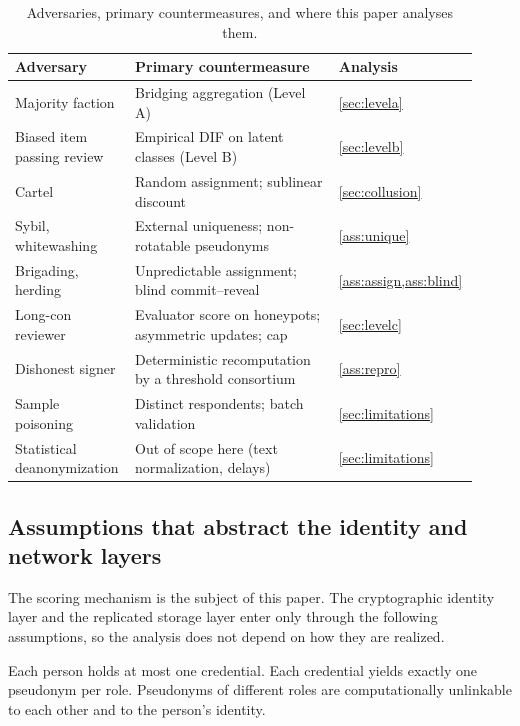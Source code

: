 \begin{table}[t]
\centering\small
\caption{Adversaries, primary countermeasures, and where this paper analyses them.}
\label{tab:threats}
\begin{tabular}{@{}>{\raggedright\arraybackslash}p{0.25\linewidth}>{\raggedright\arraybackslash}p{0.43\linewidth}>{\raggedright\arraybackslash}p{0.24\linewidth}@{}}
\toprule
Adversary & Primary countermeasure & Analysis \\
\midrule
Majority faction & Bridging aggregation (Level A) & \cref{sec:levela} \\
Biased item passing review & Empirical DIF on latent classes (Level B) & \cref{sec:levelb} \\
Cartel & Random assignment; sublinear discount & \cref{sec:collusion} \\
Sybil, whitewashing & External uniqueness; non-rotatable pseudonyms & \cref{ass:unique} \\
Brigading, herding & Unpredictable assignment; blind commit--reveal & \cref{ass:assign,ass:blind} \\
Long-con reviewer & Evaluator score on honeypots; asymmetric updates; cap & \cref{sec:levelc} \\
Dishonest signer & Deterministic recomputation by a threshold consortium & \cref{ass:repro} \\
Sample poisoning & Distinct respondents; batch validation & \cref{sec:limitations} \\
Statistical deanonymization & Out of scope here (text normalization, delays) & \cref{sec:limitations} \\
\bottomrule
\end{tabular}
\end{table}

\subsection{Assumptions that abstract the identity and network layers}\label{sec:assumptions}

The scoring mechanism is the subject of this paper. The cryptographic identity layer and the
replicated storage layer enter only through the following assumptions, so the analysis does
not depend on how they are realized.

\begin{assumption}\label{ass:unique}
Each person holds at most one credential. Each credential yields exactly one pseudonym per role.
Pseudonyms of different roles are computationally unlinkable to each other and to the
person's identity.
\end{assumption}

